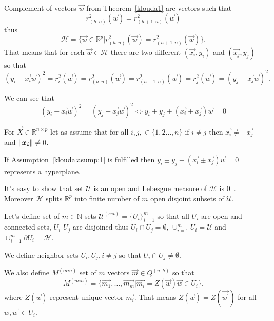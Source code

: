 \begin{corollary}
    Complement of vectors $\vec{w}$ from Theorem~\ref{klouda1} are vectors such that 
    \begin{equation}
        r^{2}_{(h:n)}(\vec{w}) = r^{2}_{(h+1:n)}(\vec{w})
    \end{equation}
    thus
    \begin{equation}
        \mathcal{H} = \{{ \vec{w} \in \mathbb{R}^{p} | r^{2}_{(h:n)}(\vec{w}) = r^{2}_{(h+1:n)}(\vec{w}) \}}.
    \end{equation}
    That means that for each $\vec{w} \in \mathcal{H}$ there are two different $(\vec{x_i}, y_i)$ and  $(\vec{x_j}, y_j)$ so that
    \begin{equation}
        (y_i - \vec{x_i} \vec{w})^2 = r^{2}_i(\vec{w}) =  r^{2}_{(h:n)}(\vec{w}) = r^{2}_{(h+1:n)}(\vec{w}) =  r^{2}_j(\vec{w}) = (y_j - \vec{x_j} \vec{w})^2.
    \end{equation}

    We can see that 
    \begin{equation}
        (y_i - \vec{x_i} \vec{w})^2 =  (y_j - \vec{x_j} \vec{w})^2 \iff      y_i \pm y_j + (\vec{x_i} \pm \vec{x_j})  \vec{w} = 0
    \end{equation}
\end{corollary}


\begin{assumption} \label{klouda:asump:1}
    For $\vec{X} \in \mathbb{R}^{n \times p}$ let as assume that for all $i,j, \in \{{1,2 \ldots, n \}}$  if $ i \neq j$ then $\vec{x_i} \neq \pm \vec{x_j}$ and $\left\lVert\boldsymbol{x_i}\right\rVert \neq 0$.
\end{assumption}

If Assumption~\ref{klouda:asump:1} is fulfilled then $ y_i \pm y_j + (\vec{x_i} \pm \vec{x_j})  \vec{w} = 0$ represents a hyperplane. 

It's easy to show that set $\mathcal{U}$ is an open and Lebesgue measure of $\mathcal{H}$  is $0$~\cite{klouda2015exact}. Moreover $\mathcal{H}$ splits $\mathbb{R}^{p}$ into finite number of $m$ open disjoint subsets of $\mathcal{U}$. 

\begin{definition}
    Let's define set of $m \in \mathbb{N}$ sets $\mathcal{U}^{(set)} = \{{ U_i\}}_{i=1}^{m}$ so that
    all $U_i$ are open and connected sets, $U_i$ $U_j$ are disjoined thus $U_i \cap  U_j = \emptyset$, $\cup_{i=1}^{m}    U_i = \mathcal{U}$ and $\cup_{i=1}^{m}    \partial U_i =  \mathcal{H}$.

    We define neighbor sets $U_i, U_j, i \neq j$ so that $ U_i \cap U_j \neq \emptyset$. 

    We also define $M^{(min)}$ set of $m$ vectors $\vec{m} \in Q^{(n,h)}$ so that 
    \begin{equation*}
        M^{(min)} = \{{ \vec{m_1}, \ldots, \vec{m_m} | \vec{m_i} = Z(\vec{w}) \vec{w} \in U_i  \}}.
    \end{equation*}
    where $Z(\vec{w})$ represent unique vector $\vec{m_i}$. That means $Z(\vec{w}) = Z(\vec{w^{\prime}})$ for all $w, w^{\prime} \in U_i$.
\end{definition}


